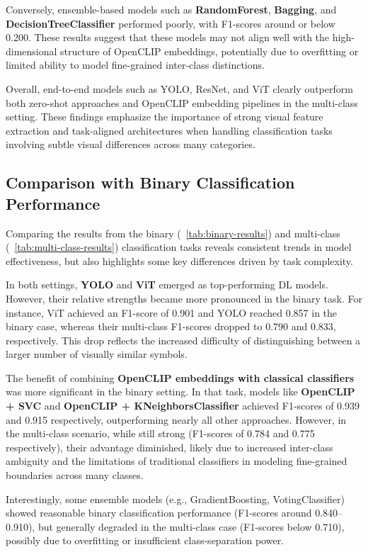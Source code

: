 Conversely, ensemble-based models such as \textbf{RandomForest}, \textbf{Bagging}, and
\textbf{DecisionTreeClassifier} performed poorly, with F1-scores around or below 0.200. These results suggest that
these models may not align well with the high-dimensional structure of OpenCLIP embeddings, potentially due to
overfitting or limited ability to model fine-grained inter-class distinctions.

Overall, end-to-end models such as \ac{YOLO}, \ac{ResNet}, and \ac{ViT} clearly outperform both zero-shot approaches and
OpenCLIP embedding pipelines in the multi-class setting. These findings emphasize the importance of strong visual
feature extraction and task-aligned architectures when handling classification tasks involving subtle visual
differences across many categories.

\subsection{Comparison with Binary Classification Performance}

Comparing the results from the binary (~\autoref{tab:binary-results}) and multi-class
(~\autoref{tab:multi-class-results}) classification tasks reveals consistent trends in model effectiveness, but also
highlights some key differences driven by task complexity.

In both settings, \textbf{\ac{YOLO}} and \textbf{\ac{ViT}} emerged as top-performing \ac{DL} models. However, their
relative strengths became more pronounced in the binary task. For instance, \ac{ViT} achieved an F1-score of 0.901 and
\ac{YOLO} reached 0.857 in the binary case, whereas their multi-class F1-scores dropped to 0.790 and 0.833,
respectively. This drop reflects the increased difficulty of distinguishing between a larger number of visually
similar symbols.

The benefit of combining \textbf{OpenCLIP embeddings with classical classifiers} was more significant in the binary
setting. In that task, models like \textbf{OpenCLIP + \ac{SVC}} and \textbf{OpenCLIP + KNeighborsClassifier} achieved
F1-scores of 0.939 and 0.915 respectively, outperforming nearly all other approaches. However, in the multi-class
scenario, while still strong (F1-scores of 0.784 and 0.775 respectively), their advantage diminished, likely due to
increased inter-class ambiguity and the limitations of traditional classifiers in modeling fine-grained boundaries
across many classes.

Interestingly, some ensemble models (e.g., GradientBoosting, VotingClassifier) showed reasonable binary
classification performance (F1-scores around 0.840–0.910), but generally degraded in the multi-class case (F1-scores
below 0.710), possibly due to overfitting or insufficient class-separation power.

